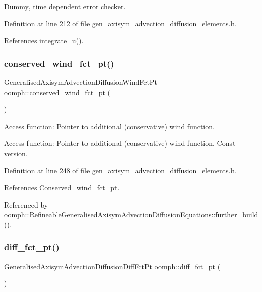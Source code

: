 Dummy, time dependent error checker. 



Definition at line 212 of file gen\+\_\+axisym\+\_\+advection\+\_\+diffusion\+\_\+elements.\+h.



References integrate\+\_\+u().

\mbox{\label{namespaceoomph_a664dfd26d500b1a6af69253d6265366b}} 
\subsubsection{\texorpdfstring{conserved\+\_\+wind\+\_\+fct\+\_\+pt()}{conserved\_wind\_fct\_pt()}}
{\footnotesize\ttfamily Generalised\+Axisym\+Advection\+Diffusion\+Wind\+Fct\+Pt oomph\+::conserved\+\_\+wind\+\_\+fct\+\_\+pt (\begin{DoxyParamCaption}{ }\end{DoxyParamCaption})}



Access function\+: Pointer to additional (conservative) wind function. 

Access function\+: Pointer to additional (conservative) wind function. Const version. 

Definition at line 248 of file gen\+\_\+axisym\+\_\+advection\+\_\+diffusion\+\_\+elements.\+h.



References Conserved\+\_\+wind\+\_\+fct\+\_\+pt.



Referenced by oomph\+::\+Refineable\+Generalised\+Axisym\+Advection\+Diffusion\+Equations\+::further\+\_\+build().

\mbox{\label{namespaceoomph_a6dd5f52cf4ab589e9675a8b36fcc0e83}} 
\subsubsection{\texorpdfstring{diff\+\_\+fct\+\_\+pt()}{diff\_fct\_pt()}}
{\footnotesize\ttfamily Generalised\+Axisym\+Advection\+Diffusion\+Diff\+Fct\+Pt oomph\+::diff\+\_\+fct\+\_\+pt (\begin{DoxyParamCaption}{ }\end{DoxyParamCaption})}



